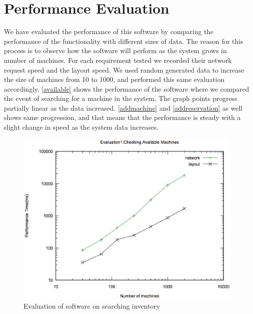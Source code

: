 \section{Performance Evaluation}
We have evaluated the performance of this software by comparing the performance of the functionality with different sizes of data. The reason for this process is to observe how the software will perform as the system grows in number of machines. For each requirement tested we recorded their network request speed and the  layout speed. We used random generated data to increase the size of machines from 10 to 1000, and performed this same evaluation accordingly. \autoref{available} shows the performance of the software where we compared the event of searching for a machine in the system. The graph points progress partially linear as the data increased. \autoref{addmachine} and \autoref{addreservation} as well shows same progression, and that means that the performance is steady with a slight change in speed as the system data increases.
\begin{figure}[h]
 \includegraphics[width=\linewidth]{available.eps}
  \caption{Evaluation of software on searching inventory}
  \label{available}
\end{figure}

